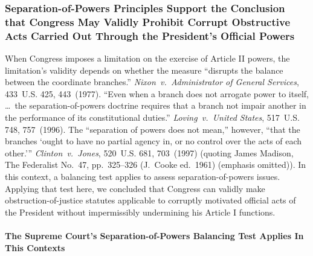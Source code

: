 \subsubsection{Separation-of-Powers Principles Support the Conclusion that Congress May Validly Prohibit Corrupt Obstructive Acts Carried Out Through the President's Official Powers}

When Congress imposes a limitation on the exercise of Article II powers, the limitation's validity depends on whether the measure ``disrupts the balance between the coordinate branches.''
\textit{Nixon~v.\ Administrator of General Services}, 433~U.S. 425, 443~(1977).
``Even when a branch does not arrogate power to itself, \dots\ the separation-of-powers doctrine requires that a branch not impair another in the performance of its constitutional duties.''
\textit{Loving~v.\ United States}, 517~U.S. 748, 757~(1996).
The ``separation of powers does not mean,'' however, ``that the branches `ought to have no partial agency in, or no control over the acts of each other.'\thinspace''
\textit{Clinton~v.\ Jones}, 520~U.S. 681, 703~(1997) (quoting James Madison, The Federalist No.~47, pp.~325--326 (J.~Cooke ed.~1961) (emphasis omitted)).
In this context, a balancing test applies to assess separation-of-powers issues.
Applying that test here, we concluded that Congress can validly make obstruction-of-justice statutes applicable to corruptly motivated official acts of the President without impermissibly undermining his Article I functions.

\paragraph{The Supreme Court's Separation-of-Powers Balancing Test Applies In This Contexts}

